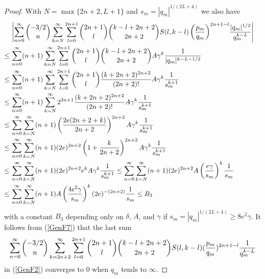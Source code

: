 \documentclass{article}
\theoremstyle{remark}
\numberwithin{equation}{section}
\begin{document}
\begin{proof}
With $N = \max\{2n+2,L+1\}$ and $s_m = \left|q_m\right|^{1/(2L+4)}$ we also have
\begin{equation} \label{GenF7} \begin{split}
& \, \left| \sum_{n=0}^\infty{\binom{-3/2}{n} \sum_{k=N}^\infty \sum_{l=0}^{2n+1} \binom{2n+1}{l} \binom{k-l+2n+2}{2n+2} 
S(l,k-l) \left( \frac{p_m}{q_m} \right)^{2n+1-l}} \frac{|q_m|^{1/2}}{q_m^{k-L}} \right| \cr
\leq & \,\sum_{n=0}^\infty (n+1) \sum_{k=N}^\infty \sum_{l=0}^{2n+1} \binom{2n+1}{l} \binom{k-l+2n+2}{2n+2}  A\gamma^k \frac{1}{|q_m|^{k-L-1/2}} \cr
\leq & \, \sum_{n=0}^\infty (n+1) \sum_{k=N}^{\infty} \sum_{l=0}^{2n+1} \binom{2n+1}{l} \frac{(k+2n+2)^{2n+2}}{(2n+2)!} A\gamma^k \frac{1}{s_m^{k+1}} \cr
\leq & \, \sum_{n=0}^\infty (n+1) \sum_{k=N}^{\infty} 2^{2n+1} \frac{(k+2n+2)^{2n+2}}{(2n+2)!} A\gamma^k  \frac{1}{s_m^{k+1}} \cr
\leq & \, \sum_{n=0}^\infty \sum_{k=N}^{\infty} (n+1) \left( \frac{2e(2n+2+k)}{2n+2} \right)^{2n+2} A\gamma^k  \frac{1}{s_m^{k+1}} \cr
\leq & \, \sum_{n=0}^\infty \sum_{k=N}^{\infty} (n+1) (2e)^{2n+2}\left( 1 + \frac{k}{2n+2} \right)^{2n+2} A\gamma^k  \frac{1}{s_m^{k+1}} \cr
\leq & \, \sum_{n=0}^\infty \sum_{k=N}^{\infty} (n+1) (2e)^{2n+2} e^k A\gamma^k  \frac{1}{s_m^{k+1}} 
\leq \sum_{n=0}^\infty \sum_{k=N}^{\infty} (n+1) (2e)^{2n+2} A \left( \frac{e\gamma}{s_m} \right)^k \frac{1}{s_m} \cr  
\leq & \, \sum_{n=0}^\infty \sum_{k=N}^{\infty} (n+1) A \left( \frac{4e^2\gamma}{s_m} \right)^k (2e)^{-(2n+2)}\frac{1}{s_m} \leq B_3 \cr
\end{split} \end{equation}
with a constant $B_3$ depending only on $\delta$, $A$, and $\gamma$ if $s_m = \left|q_m\right|^{1/(2L+4)} \geq 8e^2\gamma$. It follows from (\ref{GenF7}) that the last sum 
\begin{equation} \notag
\sum_{n=0}^\infty{\binom{-3/2}{n} \sum_{k=2n+2}^{\infty} \sum_{l=0}^{2n+1} \binom{2n+1}{l} \binom{k-l+2n+2}{2n+2} 
S(l,k-l) ( \frac{p_m}{q_m} )^{2n+1-l}} \frac{1}{q_m^{k-L}} 
\end{equation}
in (\ref{GenF2}) converges to $0$ when $q_m$ tends to $\infty$.


\end{proof}
\end{document}
